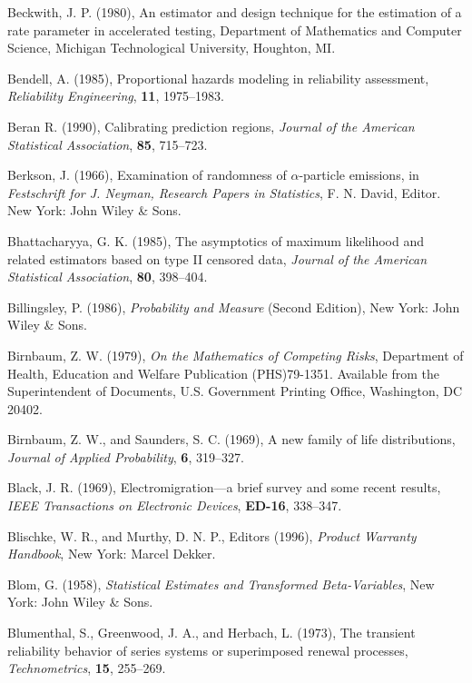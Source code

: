 \begin{thebibliography}{999}
Beckwith, J. P. (1980), An estimator and design technique for the
estimation of a rate parameter in accelerated testing, Department of
Mathematics and Computer Science, Michigan Technological University,
Houghton, MI.


Bendell, A. (1985), Proportional hazards modeling in reliability
assessment, {\em Reliability Engineering}, {\bf 11}, 1975--1983.

Beran R. (1990), Calibrating prediction regions, {\em Journal of the
American Statistical Association}, {\bf 85}, 715--723.

Berkson, J. (1966), Examination of randomness of $\alpha$-particle
emissions, in {\em Festschrift for J. Neyman, Research Papers in
Statistics}, F. N. David, Editor. New York: John Wiley \& Sons.

Bhattacharyya, G. K. (1985), The asymptotics of maximum likelihood and
related estimators based on type II censored data, {\em Journal of the
American Statistical Association}, {\bf 80}, 398--404.

Billingsley, P. (1986), {\em Probability and Measure} (Second
Edition), New York: John Wiley \& Sons.

Birnbaum, Z. W. (1979), {\em On the Mathematics of Competing Risks},
Department of Health, Education and Welfare Publication (PHS)79-1351.
Available from the Superintendent of Documents, U.S.  Government
Printing Office, Washington, DC 20402.

Birnbaum, Z. W., and Saunders, S. C. (1969), A new family of life
distributions, {\em Journal of Applied Probability}, {\bf 6}, 319--327.

Black, J. R. (1969), Electromigration---a brief survey and some
recent results, {\em IEEE Transactions on Electronic Devices}, {\bf
ED-16}, 338--347.


Blischke, W. R., and Murthy, D. N. P., Editors (1996), {\em Product Warranty
Handbook}, New York: Marcel Dekker.

Blom, G. (1958), {\em Statistical Estimates and Transformed
Beta-Variables}, New York: John Wiley \& Sons.

Blumenthal, S., Greenwood, J. A., and Herbach, L. (1973), The transient
reliability behavior of series systems or superimposed renewal
processes, {\em Technometrics}, {\bf 15}, 255--269.


\end{thebibliography}
